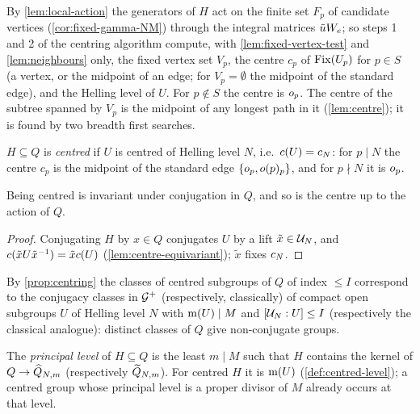 By \cref{lem:local-action} the generators of $H$ act on the finite set $F_p$
of candidate vertices (\cref{cor:fixed-gamma-NM}) through the integral
matrices $\tilde uW_{e}$; so steps 1 and 2 of the centring algorithm
compute, with \cref{lem:fixed-vertex-test} and \cref{lem:neighbours} only,
the fixed vertex set $V_p$, the centre $c_p$ of $\mathrm{Fix}(U_p)$ for $p \in S$
(a vertex, or the midpoint of an edge; for $V_p = \emptyset$ the midpoint of
the standard edge), and the Helling level of $U$. For $p \notin S$ the centre
is $o_{p}$. The centre of the subtree spanned by $V_p$ is the
midpoint of any longest path in it (\cref{lem:centre}); it is found by two
breadth first searches.

\begin{definition}\label{def:centred-subgroup}
$H \subseteq Q$ is \emph{centred} if $U$ is centred of Helling level $N$, i.e.\
$c(U) = c_{N}$: for $p \mid N$ the centre $c_p$ is the midpoint of
the standard edge $\{o_{p}, o(p)_{p}\}$, and for
$p \nmid N$ it is $o_{p}$.
\end{definition}

\begin{lemma}\label{lem:centred-class-invariant}
Being centred is invariant under conjugation in $Q$, and so is the centre
up to the action of $Q$.
\end{lemma}

\begin{proof}
Conjugating $H$ by $x \in Q$ conjugates $U$ by a lift $\tilde x \in
\mathcal{U}_{N}$, and $c(\tilde xU\tilde x^{-1}) = \tilde xc(U)$
(\cref{lem:centre-equivariant}); $\tilde x$ fixes $c_{N}$.
\end{proof}

By \cref{prop:centring} the classes of centred subgroups of $Q$ of index
$\leq I$ correspond to the conjugacy classes in $\mathcal{G}^{+}$ (respectively,
classically) of compact open subgroups $U$ of Helling level $N$ with
$\operatorname{m}(U) \mid M$ and $[\mathcal{U}_{N}:U] \leq I$
(respectively the classical analogue): distinct classes of $Q$ give
non-conjugate groups.

\begin{definition}\label{def:principal-level}
The \emph{principal level} of $H \subseteq Q$ is the least $m \mid M$ such that
$H$ contains the kernel of $Q \to \widehat{Q}_{N,m}$ (respectively
$\widetilde{Q}_{N,m}$). For centred $H$ it is
$\operatorname{m}(U)$ (\cref{def:centred-level}); a centred group whose
principal level is a proper divisor of $M$ already occurs at that level.
\end{definition}

